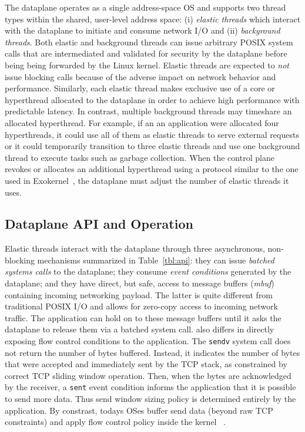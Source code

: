The \ix dataplane operates as a single address-space OS and supports
two thread types within the shared, user-level address space: (i)
\emph{elastic threads} which interact with the \ix dataplane to
initiate and consume network I/O and (ii) \emph{background threads}.
Both elastic and background threads can issue arbitrary POSIX system
calls that are  intermediated and validated for security
by the dataplane before being being forwarded
by the Linux kernel.  Elastic threads are expected to \emph{not} issue
blocking calls because of the adverse impact on network behavior and
performance. Similarly, each elastic thread makes exclusive use of a
core or hyperthread allocated to the dataplane in order to achieve
high performance with predictable latency. In contrast, multiple
background threads may timeshare an allocated hyperthread. For example, if an
an application were allocated four hyperthreads, it could
use all of them as elastic threads to serve external requests or it could
temporarily transition to three elastic threads and use one background thread
to execute tasks such as garbage collection. When the control plane
revokes or allocates an additional hyperthread using a protocol
similar to the one used in Exokernel~\cite{DBLP:conf/sosp/EnglerKO95},
the dataplane must adjust the number of elastic threads it uses.


\subsection{Dataplane API and Operation}
\label{sec:impl:kernel}

Elastic threads interact with the \ix dataplane through three
asynchronous, non-blocking mechanisms summarized in
Table~\ref{tbl:api}: they can issue \emph{batched systems calls} to
the dataplane; they consume \emph{event conditions} generated by the
dataplane; and they have direct, but safe, access to message buffers
(\emph{mbuf}) containing incoming networking payload. The latter is
quite different from traditional POSIX I/O and allows for
zero-copy access to incoming network traffic.  The application can
hold on to these message buffers until it asks the dataplane to release them via a batched
system call.  \ix also differs in directly exposing flow control
conditions to the application. The \texttt{sendv} system call does
not return the number of bytes buffered.  Instead,
it indicates the number of bytes that were accepted and immediately sent by
the TCP stack, as constrained by correct TCP sliding window operation. Then,
when the bytes are acknowledged by the receiver, a \texttt{sent} event
condition informs the application that it is possible to send more data. Thus send
window sizing policy is determined entirely by the application.
By constrast, todays OSes buffer send data (beyond raw TCP constraints) and
apply flow control policy inside the kernel ~\cite{dynamicwindow}.

